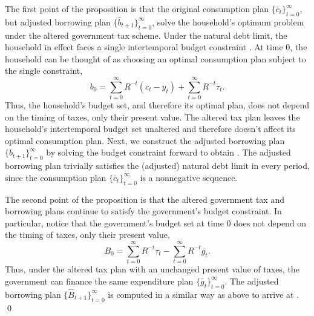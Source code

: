  The first point of the proposition
is that the original consumption plan $\{\bar c_t\}_{t=0}^\infty$, but adjusted
borrowing plan $\{\hat b_{t+1}\}_{t=0}^\infty$, solve the household's optimum
problem under the altered government tax scheme.
    Under the natural debt limit,
the household in effect faces  a single intertemporal
budget constraint . At time $0$, the household can be
thought of as choosing an optimal consumption plan subject to
the single constraint,
$$ b_0 = \sum_{t=0}^\infty R^{-t} (c_{t} - y_{t})
        +  \sum_{t=0}^\infty R^{-t} \tau_{t}.$$
Thus, the household's budget set, and therefore its optimal  plan,
does not depend
on the timing of taxes, only their present value.   The altered
tax plan leaves the household's   intertemporal   budget set unaltered
and therefore doesn't affect its optimal consumption plan. Next,
we construct the adjusted borrowing plan
$\{\hat b_{t+1}\}_{t=0}^\infty$ by solving the budget constraint 
forward to obtain .
The adjusted borrowing plan trivially
satisfies  the (adjusted) natural debt limit in every period,
since the consumption
plan $\{\bar c_t\}_{t=0}^\infty$ is a nonnegative sequence.

The second point of the proposition is that the altered government tax
and borrowing plans continue to satisfy the government's budget constraint.
In particular, notice that the government's budget set at time $0$ does
not depend on the timing of taxes, only their present value,
$$
B_0  = \sum_{t=0}^\infty R^{-t} \tau_t - \sum_{t=0}^\infty R^{-t} g_{t}.
$$
Thus, under the altered tax plan with an unchanged present value of taxes,
the government can finance the same expenditure plan $\{\bar g_t\}_{t=0}^\infty$.
The adjusted borrowing plan $\{\hat B_{t+1}\}_{t=0}^\infty$ is computed
in a similar way as above to arrive at . \qed

